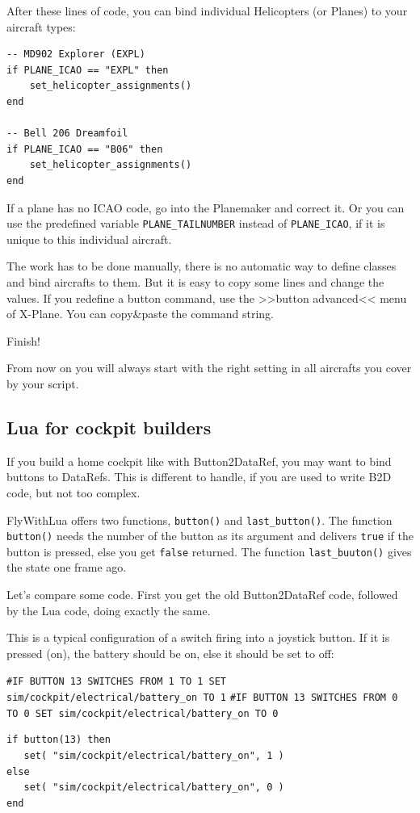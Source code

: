 \documentclass[11pt,parskip=half,a4paper]{scrartcl}
\begin{document}
After these lines of code, you can bind individual Helicopters (or Planes) to your aircraft types:

\begin{lstlisting}[firstnumber=156]
-- MD902 Explorer (EXPL)
if PLANE_ICAO == "EXPL" then
    set_helicopter_assignments()
end

-- Bell 206 Dreamfoil
if PLANE_ICAO == "B06" then
    set_helicopter_assignments()
end
\end{lstlisting}

If a plane has no ICAO code, go into the Planemaker and correct it. Or you can use the predefined variable \verb|PLANE_TAILNUMBER| instead of \verb|PLANE_ICAO|, if it is unique to this individual aircraft.

The work has to be done manually, there is no automatic way to define classes and bind aircrafts to them. But it is easy to copy some lines and change the values. If you redefine a button command, use the >>button advanced<< menu of X-Plane. You can copy\&paste the command string.

Finish!

From now on you will always start with the right setting in all aircrafts you cover by your script.

\subsection{Lua for cockpit builders}

If you build a home cockpit like with Button2DataRef, you may want to bind buttons to DataRefs. This is different to handle, if you are used to write B2D code, but not too complex.

FlyWithLua offers two functions, \verb|button()| and \verb|last_button()|. The function \verb|button()| needs the number of the button as its argument and delivers \verb|true| if the button is pressed, else you get \verb|false| returned. The function \verb|last_buuton()| gives the state one frame ago.

Let's compare some code. First you get the old Button2DataRef code, followed by the Lua code, doing exactly the same.

This is a typical configuration of a switch firing into a joystick button. If it is pressed (on), the battery should be on, else it should be set to off:

\verb|#IF BUTTON 13 SWITCHES FROM 1 TO 1 SET sim/cockpit/electrical/battery_on TO 1|
\verb|#IF BUTTON 13 SWITCHES FROM 0 TO 0 SET sim/cockpit/electrical/battery_on TO 0|
\begin{lstlisting}
if button(13) then
   set( "sim/cockpit/electrical/battery_on", 1 )
else
   set( "sim/cockpit/electrical/battery_on", 0 )
end
\end{lstlisting}
\end{document}
